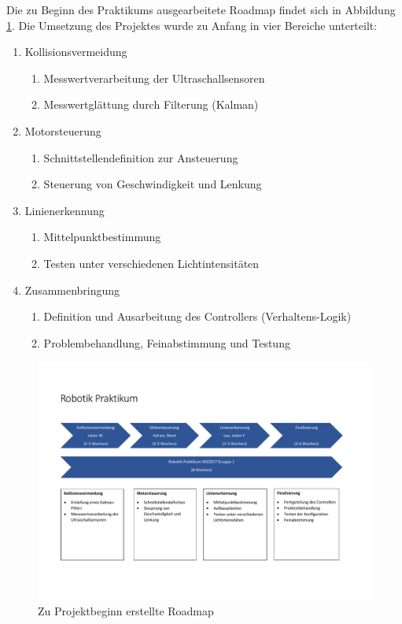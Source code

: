 \documentclass[12pt, a4paper]{scrartcl}
\begin{document}
Die zu Beginn des Praktikums ausgearbeitete Roadmap findet sich in Abbildung \ref{img_Roadmap_Gr1}.
\newpage
Die Umsetzung des Projektes wurde zu Anfang in vier Bereiche unterteilt:
\begin{enumerate}
	\item{Kollisionsvermeidung
	\begin{enumerate}
		\item Messwertverarbeitung der Ultraschallsensoren
		\item Messwertglättung durch Filterung (Kalman)
	\end{enumerate}}
	\item {Motorsteuerung
		\begin{enumerate}
		\item Schnittstellendefinition zur Ansteuerung
		\item Steuerung von Geschwindigkeit und Lenkung
		\end{enumerate}}
	\item{Linienerkennung
	\begin{enumerate}
		\item Mittelpunktbestimmung
		\item Testen unter verschiedenen Lichtintensitäten
		\end{enumerate}}
		\item{Zusammenbringung
		\begin{enumerate}
			\item Definition und Ausarbeitung des Controllers (Verhaltens-Logik)
			\item Problembehandlung, Feinabstimmung und Testung
		\end{enumerate}}
\end{enumerate}

\begin{figure}
\centering
\includegraphics[width=\textwidth, height=8cm, keepaspectratio]{Bilder/Roadmap_Gr1.pdf}
\caption{Zu Projektbeginn erstellte Roadmap}
\label{img_Roadmap_Gr1}
\end{figure}
\end{document}
